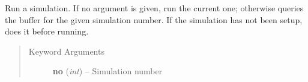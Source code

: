 \documentclass[letterpaper,10pt,english]{sphinxmanual}
\begin{document}

\begin{fulllineitems}
\label{index:facade.run}
Run a simulation. If no argument is given, run the current one;
otherwise queries the buffer for the given simulation number.
If the simulation has not been setup, does it before running.
\begin{quote}\begin{description}
\item[{Keyword Arguments}] \leavevmode
\textbf{no} (\emph{int}) --
Simulation number

\end{description}\end{quote}

\end{fulllineitems}

\end{document}
